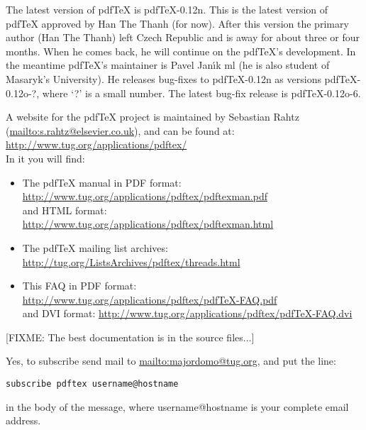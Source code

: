 \documentclass[11pt]{article}
\begin{document}
{


The latest version of pdfTeX is pdfTeX-0.12n. This is the latest
  version of pdfTeX approved by Han The Thanh (for now). After this
  version the primary author (Han The Thanh) left Czech Republic and
  is away for about three or four months. When he comes back, he will
  continue on the pdfTeX's development. In the meantime pdfTeX's
  maintainer is Pavel Jan\'{\i}k ml (he is also student of Masaryk's
  University). He releases bug-fixes to pdfTeX-0.12n as versions
  pdfTeX-0.12o-?, where `?' is a small number. The latest bug-fix
  release is pdfTeX-0.12o-6.  }



{ 

A website for the pdfTeX project is maintained by Sebastian Rahtz
  (\url{mailto:s.rahtz@elsevier.co.uk}), and can
  be found at:\\
  \url{http://www.tug.org/applications/pdftex/}\\
  In it you will find:
  \begin{itemize}
    \item The pdfTeX manual in PDF format:\\
    \url{http://www.tug.org/applications/pdftex/pdftexman.pdf}\\
    and HTML format:\\
    \url{http://www.tug.org/applications/pdftex/pdftexman.html}
    \item The pdfTeX mailing list archives:\\
    \url{http://tug.org/ListsArchives/pdftex/threads.html}
    \item This FAQ in PDF format:\\
    \url{http://www.tug.org/applications/pdftex/pdfTeX-FAQ.pdf}\\
    and DVI format:
    \url{http://www.tug.org/applications/pdftex/pdfTeX-FAQ.dvi}
  \end{itemize}

  [FIXME: The best documentation is in the source files...]  }


{ 

Yes, to subscribe send mail to \url{mailto:majordomo@tug.org}, and
  put the line:
\begin{verbatim}
subscribe pdftex username@hostname
\end{verbatim}
  in the body of the message, where username@hostname is your complete
  email address.  }
\end{document}
